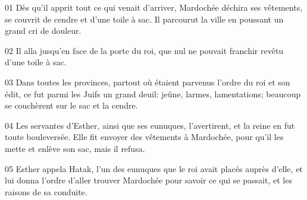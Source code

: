 01 Dès qu’il apprit tout ce qui venait d’arriver, Mardochée déchira ses vêtements, se couvrit de cendre et d’une toile à sac. Il parcourut la ville en poussant un grand cri de douleur.

02 Il alla jusqu’en face de la porte du roi, que nul ne pouvait franchir revêtu d’une toile à sac.

03 Dans toutes les provinces, partout où étaient parvenus l’ordre du roi et son édit, ce fut parmi les Juifs un grand deuil: jeûne, larmes, lamentations; beaucoup se couchèrent sur le sac et la cendre.

04 Les servantes d’Esther, ainsi que ses eunuques, l’avertirent, et la reine en fut toute bouleversée. Elle fit envoyer des vêtements à Mardochée, pour qu’il les mette et enlève son sac, mais il refusa.

05 Esther appela Hatak, l’un des eunuques que le roi avait placés auprès d’elle, et lui donna l’ordre d’aller trouver Mardochée pour savoir ce qui se passait, et les raisons de sa conduite.
